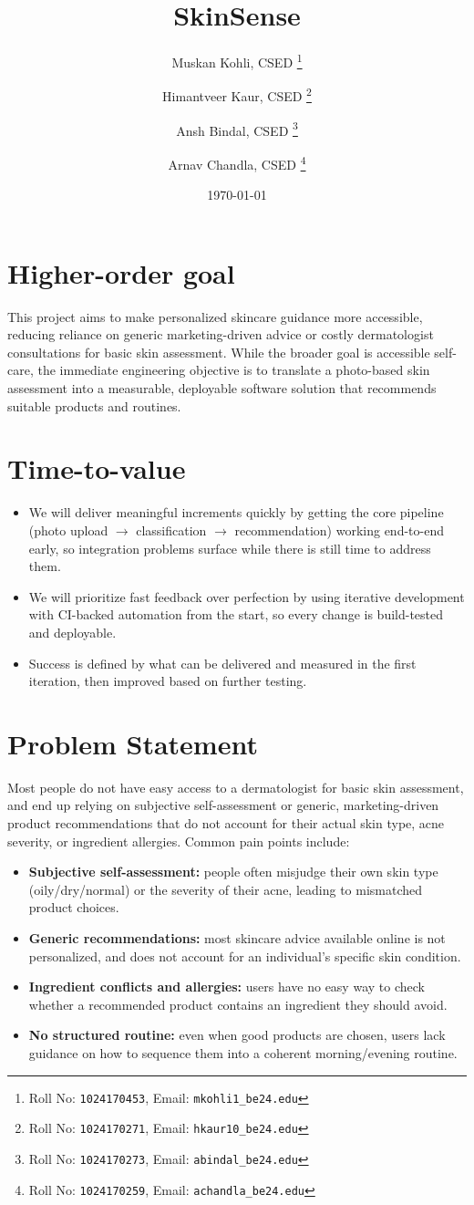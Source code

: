 \documentclass[11pt,a4paper]{article}
\title{SkinSense}
\author{
  Muskan Kohli, CSED%
  \thanks{Roll No: \texttt{1024170453}, %
    Email: \texttt{mkohli1\_be24\@thapar.edu}}
  \and
  Himantveer Kaur, CSED%
  \thanks{Roll No: \texttt{1024170271}, %
    Email: \texttt{hkaur10\_be24\@thapar.edu}}
  \and
  Ansh Bindal, CSED%
  \thanks{Roll No: \texttt{1024170273}, %
    Email: \texttt{abindal\_be24\@thapar.edu}}
  \and
  Arnav Chandla, CSED%
  \thanks{Roll No: \texttt{1024170259}, %
    Email: \texttt{achandla\_be24\@thapar.edu}}
}
\date{\today}
\begin{document}
\maketitle

\section{Higher-order goal}
This project aims to make personalized skincare guidance
more accessible, reducing reliance on generic
marketing-driven advice or costly dermatologist
consultations for basic skin assessment. While the
broader goal is accessible self-care, the immediate
engineering objective is to translate a photo-based skin
assessment into a measurable, deployable software
solution that recommends suitable products and routines.

\section{Time-to-value}
\begin{itemize}[leftmargin=0.7cm]
    \item We will deliver meaningful increments quickly by getting the core pipeline (photo upload $\rightarrow$ classification $\rightarrow$ recommendation) working end-to-end early, so integration problems surface while there is still time to address them.
    \item We will prioritize fast feedback over perfection by using iterative development with CI-backed automation from the start, so every change is build-tested and deployable.
    \item Success is defined by what can be delivered and measured in the first iteration, then improved based on further testing.
\end{itemize}

\section{Problem Statement}
Most people do not have easy access to a dermatologist
for basic skin assessment, and end up relying on
subjective self-assessment or generic, marketing-driven
product recommendations that do not account for their
actual skin type, acne severity, or ingredient
allergies. Common pain points include:
\begin{itemize}[leftmargin=0.7cm]
    \item \textbf{Subjective self-assessment:} people often misjudge their own skin type (oily/dry/normal) or the severity of their acne, leading to mismatched product choices.
    \item \textbf{Generic recommendations:} most skincare advice available online is not personalized, and does not account for an individual's specific skin condition.
    \item \textbf{Ingredient conflicts and allergies:} users have no easy way to check whether a recommended product contains an ingredient they should avoid.
    \item \textbf{No structured routine:} even when good products are chosen, users lack guidance on how to sequence them into a coherent morning/evening routine.
\end{itemize}
\end{document}

